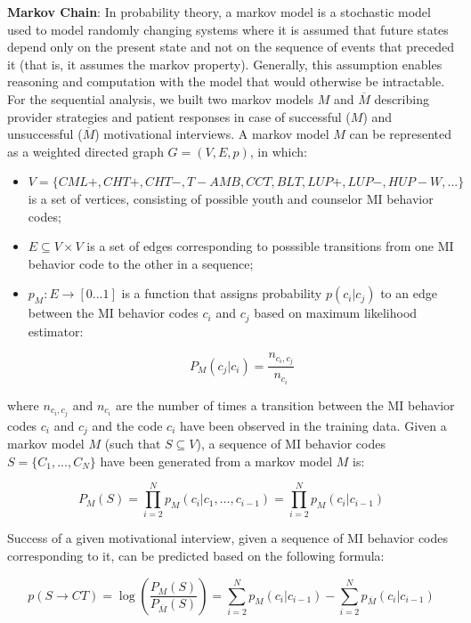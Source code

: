 \documentclass{amia}
\begin{document}
\textbf {Markov Chain}: In probability theory, a markov model \cite{} is a stochastic model used to model randomly changing systems where it is assumed that future states depend only on the present state and not on the sequence of events that preceded it (that is, it assumes the markov property). Generally, this assumption enables reasoning and computation with the model that would otherwise be intractable. For the sequential analysis, we built two markov models $M$ and $\overline{M}$ describing provider strategies and patient responses in case of successful ($M$) and unsuccessful ($\overline{M}$) motivational interviews. A markov model $M$ can be represented as a weighted directed graph $G = (V, E, p)$, in which:

\begin{itemize}
\item $V = \{CML+, CHT+, CHT-, T-AMB, CCT, BLT, LUP+, LUP-, HUP-W, ...\}$ is a set of vertices, consisting of possible youth and counselor MI behavior codes;
\item $E \subseteq V \times V$ is a set of edges corresponding to posssible transitions from one MI behavior code to the other in a sequence;
\item $p_M:E\rightarrow[0...1]$ is a function that assigns probability $p(c_i|c_j)$ to an edge between the MI behavior codes $c_i$ and $c_j$ based on maximum likelihood estimator:

\begin{equation}
P_M(c_j|c_i) = \frac{n_{c_i,c_j}}{n_{c_i}}
\end{equation}

\end{itemize}

where $n_{c_i,c_j}$ and $n_{c_i}$ are the number of times a transition between the MI behavior codes $c_i$ and $c_j$ and the code $c_i$ have been observed in the training data. Given a markov model $M$ (such that $S\subseteq V$), a sequence of MI behavior codes $S = \{C_1,...,C_N\}$ have been generated from a markov model $M$ is:

\begin{equation}
P_M(S) = \prod_{i=2}^N p_M(c_i|c_1,\dots,c_{i-1})=\prod_{i=2}^N p_M(c_i|c_{i-1})
\end{equation}

Success of a given motivational interview, given a sequence of MI behavior codes corresponding to it, can be predicted based on the following formula:

\begin{equation}
p(S\rightarrow CT) = \log\left(\frac{P_M(S)}{P_{\overline M}(S)}\right)= \sum_{i=2}^N p_M(c_i|c_{i-1})-\sum_{i=2}^N p_{\overline M}(c_i|c_{i-1})
\end{equation}
\end{document}
